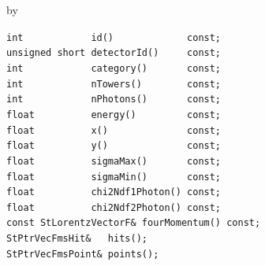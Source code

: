 \documentclass[twoside]{article}
\newcommand{\entrylabel}[1]{\mbox{\textbf{{#1}}}\hfil}%
\newenvironment{entry}
{\begin{list}{}%
    {\renewcommand{\makelabel}{\entrylabel}%
     \setlength{\labelwidth}{90pt}%
     \setlength{\leftmargin}{\labelwidth}
     \advance\leftmargin by \labelsep%
      }%
    }%
  {\end{list}}
\newcommand{\Entrylabel}[1]%
{\raisebox{0pt}[1ex][0pt]{\makebox[\labelwidth][l]%
    {\parbox[t]{\labelwidth}{\hspace{0pt}\textbf{{#1}}}}}}
\newenvironment{Entry}%
{\renewcommand{\entrylabel}{\Entrylabel}\begin{entry}}%
  {\end{entry}}
\begin{document}
\begin{Entry}
\item[Public Member\\ Functions]
    \verb+int            id()             const;+\\
    \verb+unsigned short detectorId()     const;+\\
    \verb+int            category()       const;+\\
    \verb+int            nTowers()        const;+\\
    \verb+int            nPhotons()       const;+\\
    \verb+float          energy()         const;+\\
    \verb+float          x()              const;+\\
    \verb+float          y()              const;+\\
    \verb+float          sigmaMax()       const;+\\
    \verb+float          sigmaMin()       const;+\\
    \verb+float          chi2Ndf1Photon() const;+\\
    \verb+float          chi2Ndf2Photon() const;+\\
    \verb+const StLorentzVectorF& fourMomentum() const;+\\
    \verb+StPtrVecFmsHit&   hits();+\\
    \verb+StPtrVecFmsPoint& points();+\\
\end{Entry}
\clearpage

\end{document}
